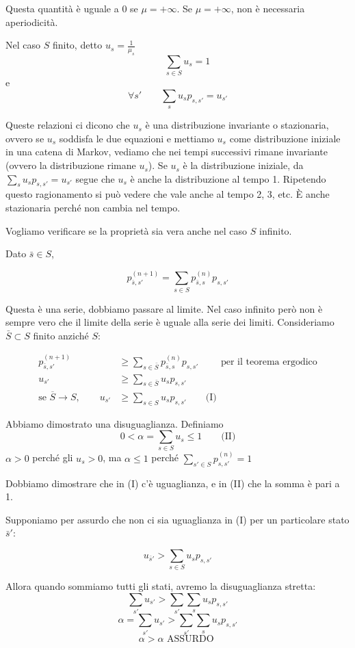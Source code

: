 \documentclass[a4paper,12pt]{book}
\newcommand\ddfrac[2]{\frac{\displaystyle #1}{\displaystyle #2}}
\begin{document}
Questa quantità è uguale a 0 se $ \mu = +\infty $. Se $ \mu= +\infty $, non è necessaria aperiodicità. 

Nel caso $ S $ finito, detto $ u_s = \ddfrac{1}{\mu_s} $
$$ \qquad \displaystyle \sum_{s \in S} u_s = 1 $$
e
$$ \forall s' \qquad \sum_{s} u_s p_{s,s'} = u_{s'}$$

Queste relazioni ci dicono che $ u_s $ è una distribuzione invariante o stazionaria, ovvero se $ u_s $ soddisfa le due equazioni e mettiamo $ u_s $ come distribuzione iniziale in una catena di Markov, vediamo che nei tempi successivi rimane invariante (ovvero la distribuzione rimane $ u_s $). Se $ u_s $ è la distribuzione iniziale, da $ \sum_{s} u_s p_{s,s'} = u_{s'} $ segue che $ u_s $ è anche la distribuzione al tempo 1. Ripetendo questo ragionamento si può vedere che vale anche al tempo 2, 3, etc. È anche stazionaria perché non cambia nel tempo.

Vogliamo verificare se la proprietà sia vera anche nel caso $ S $ infinito. 

Dato $ \bar{s} \in S $,

$$ p_{\bar{s},s'}^{(n+1)} = \sum_{s \in S} p_{\bar{s}, s}^{(n)} p_{s,s'} $$


Questa è una serie, dobbiamo passare al limite. Nel caso infinito però non è sempre vero che il limite della serie è uguale alla serie dei limiti. Consideriamo $ \bar{S} \subset S $ finito anziché $ S $:

\begin{align*}
	p_{\bar{s}, s'}^{(n+1)} & \ge \sum_{s \in \bar{S} } p_{\bar{s},s}^{(n)} p_{s,s'} \qquad \text { per il teorema ergodico} \\
	u_{s'} & \ge \sum_{s \in \bar{S}} u_s p_{s,s'} \\
	\text{se } \overline{S} \to S, \qquad u_{s'} & \ge \sum_{s \in S} u_sp_{s,s'} \qquad \text{(I)}
\end{align*}

Abbiamo dimostrato una disuguaglianza. Definiamo 
$$ 0 < \alpha = \sum_{s \in S} u_s \le 1 \qquad \text{(II)} $$
$\alpha > 0$ perché gli $ u_s > 0$, ma $ \alpha \le 1$ perché $ \sum_{s' \in S} p_{s,s'}^{(n)} = 1 $

Dobbiamo dimostrare che in (I) c'è uguaglianza, e in (II) che la somma è pari a 1.

Supponiamo per assurdo che non ci sia uguaglianza in (I) per un particolare stato $\bar{s}'$:

$$ u_{\bar{s}'} > \sum_{s \in S} u_s p_{s,s'} $$

Allora quando sommiamo tutti gli stati, avremo la disuguaglianza stretta:
$$ \sum_{s'} u_{s'} > \sum_{s'} \sum_{s} u_s p_{s,s'} $$
$$ \alpha = \sum_{s'} u_{s'} > \sum_{s'} \sum_{s} u_s p_{s,s'}$$
$$ \alpha > \alpha \text{ ASSURDO } $$
\end{document}
